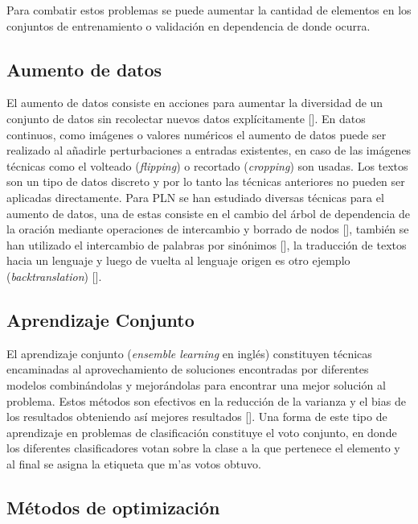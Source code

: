 Para combatir estos problemas se puede aumentar la cantidad de elementos en los conjuntos de entrenamiento o 
validación en dependencia de donde ocurra.

\subsection{Aumento de datos}

El aumento de datos consiste en acciones para aumentar la diversidad de un conjunto de datos sin recolectar
nuevos datos explícitamente [\cite{feng2021data}]. En datos continuos, como imágenes o valores numéricos el 
aumento de datos puede ser realizado al añadirle perturbaciones a entradas existentes, en caso de las imágenes 
técnicas como el volteado (\emph{flipping}) o recortado (\emph{cropping}) son usadas. Los textos son un tipo 
de datos discreto y por lo tanto las técnicas anteriores no pueden ser aplicadas directamente. Para PLN
se han estudiado diversas técnicas para el aumento de datos, una de estas consiste en el cambio del árbol de 
dependencia de la oración mediante operaciones de intercambio y borrado de nodos [\cite{csahin2019data}], también se han utilizado 
el intercambio de palabras por sinónimos [\cite{dai2020analysis}], la traducción de textos hacia un lenguaje y luego 
de vuelta al lenguaje origen es otro ejemplo (\emph{backtranslation}) [\cite{sennrich2015improving}]. 

\subsection{Aprendizaje Conjunto}

El aprendizaje conjunto (\emph{ensemble learning} en inglés) constituyen técnicas encaminadas al aprovechamiento
de soluciones encontradas por diferentes modelos combinándolas y mejorándolas para encontrar una mejor solución 
al problema. Estos métodos son efectivos en la reducción de la varianza y el bias de los resultados obteniendo así
mejores resultados [\cite{dietterich2002ensemble}]. Una forma de este tipo de aprendizaje en problemas de 
clasificación constituye el voto conjunto, en donde los diferentes clasificadores votan sobre la clase a la que 
pertenece el elemento y al final se asigna la etiqueta que m'as votos obtuvo.

\subsection{Métodos de optimización}

